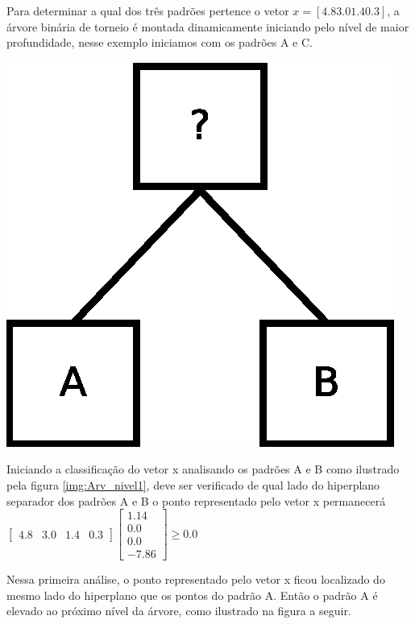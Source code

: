 Para determinar a qual dos três padrões pertence o vetor $x = [4.8  3.0  1.4  0.3]$, a árvore binária de torneio é montada dinamicamente iniciando pelo nível de maior profundidade, nesse exemplo iniciamos com os padrões A e C.

\begin{center}
	\includegraphics[scale=0.4]{graficos/arvore_nivel1}
	\label{img:Arv_nivel1}
\end{center}

Iniciando a classificação do vetor x analisando os padrões A e B como ilustrado pela figura \ref{img:Arv_nivel1}, deve ser verificado de qual lado do hiperplano separador dos padrões A e B o ponto representado pelo vetor x permanecerá
$ \begin{bmatrix}
4.8 & 3.0 & 1.4 & 0.3 
\end{bmatrix}
\begin{bmatrix}
1.14
\\ 
0.0
\\
0.0 
\\
-7.86 
\end{bmatrix}
\geq  0.0 $ 

Nessa primeira análise, o ponto representado pelo vetor x ficou localizado do mesmo lado do hiperplano que os pontos do padrão A. Então o padrão A é elevado ao próximo nível da árvore, como ilustrado na figura a seguir.

